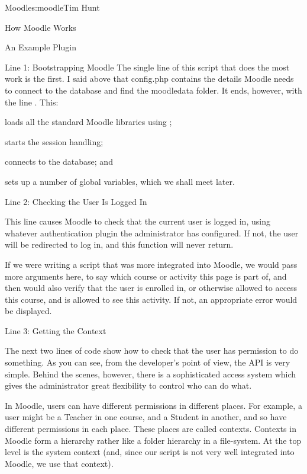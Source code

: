 \begin{aosachapter}{Moodle}{s:moodle}{Tim Hunt}
\begin{aosasect1}{How Moodle Works}
\begin{aosasect2}{An Example Plugin}
\begin{aosasect3}{Line 1: Bootstrapping Moodle}
The single line of this script that does the most work is the first. I
said above that config.php contains the details Moodle needs to
connect to the database and find the moodledata folder. It ends,
however, with the line . This:

\begin{aosaenumerate}

\item loads all the standard Moodle libraries using ;

\item starts the session handling;

\item connects to the database; and

\item sets up a number of global variables, which we shall meet later.

\end{aosaenumerate}

\end{aosasect3}

\begin{aosasect3}{Line 2: Checking the User Is Logged In}

This line causes Moodle to check that the current user is logged in,
using whatever authentication plugin the administrator has
configured. If not, the user will be redirected to log in, and this
function will never return.

If we were writing a script that was more integrated into Moodle, we
would pass more arguments here, to say which course or activity this
page is part of, and then  would also verify that
the user is enrolled in, or otherwise allowed to access this course,
and is allowed to see this activity. If not, an appropriate error
would be displayed.

\end{aosasect3}

\begin{aosasect3}{Line 3: Getting the Context}

The next two lines of code show how to check that the user has
permission to do something. As you can see, from the developer's point
of view, the API is very simple. Behind the scenes, however, there is
a sophisticated access system which gives the administrator great
flexibility to control who can do what.

In Moodle, users can have different permissions in different
places. For example, a user might be a Teacher in one course, and a
Student in another, and so have different permissions in each
place. These places are called contexts. Contexts in Moodle form a
hierarchy rather like a folder hierarchy in a file-system. At the top
level is the system context (and, since our script is not very well
integrated into Moodle, we use that context).


\end{aosasect3}
\end{aosasect2}
\end{aosasect1}
\end{aosachapter}
